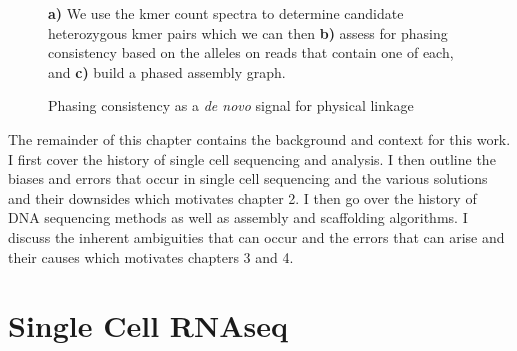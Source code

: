 \begin{figure}[htbp!]
\begin{centering}

\caption{Phasing consistency as a \textit{de novo} signal for physical linkage}\label{fig:phasstools}
\par{\textbf{a)} We use the kmer count spectra to determine candidate heterozygous kmer pairs which we can then \textbf{b)} assess for phasing consistency based on the alleles on reads that contain one of each, and \textbf{c)} build a phased assembly graph.}
\end{centering}
\end{figure}

\par{
The remainder of this chapter contains the background and context for this work. I first cover the history of single cell sequencing and analysis. I then outline the biases and errors that occur in single cell sequencing and the various solutions and their downsides which motivates chapter 2. I then go over the history of DNA sequencing methods as well as assembly and scaffolding algorithms. I discuss the inherent ambiguities that can occur and the errors that can arise and their causes which motivates chapters 3 and 4.
}

\section{Single Cell RNAseq}

